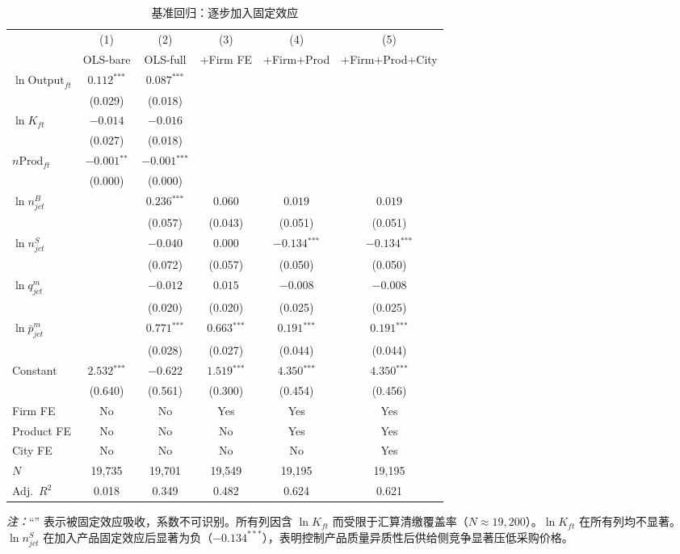 \documentclass[12pt]{article}
\newcommand{\sym}[1]{\ensuremath{^{\text{#1}}}}
\newcommand{\se}[1]{{\small(#1)}}
\newcommand{\abs}{\textemdash}
\newcommand{\mis}{}
\begin{document}
\begin{table}[H]
\centering\small
\begin{threeparttable}
\caption{基准回归：逐步加入固定效应}
\begin{tabular}{l *{5}{c}}
\toprule
 & (1) & (2) & (3) & (4) & (5) \\
 & OLS-bare & OLS-full & {+Firm FE} & {+Firm+Prod} & {+Firm+Prod+City} \\
\midrule
$\ln\mathrm{Output}_{ft}$
  & $0.112\sym{***}$ & $0.087\sym{***}$ & \abs & \abs & \abs \\
  & \se{0.029} & \se{0.018} & & & \\[3pt]
$\ln K_{ft}$
  & $-0.014$ & $-0.016$ & \abs & \abs & \abs \\
  & \se{0.027} & \se{0.018} & & & \\[3pt]
$n\mathrm{Prod}_{ft}$
  & $-0.001\sym{**}$ & $-0.001\sym{***}$ & \abs & \abs & \abs \\
  & \se{0.000} & \se{0.000} & & & \\[3pt]
$\ln n^{B}_{jct}$
  & \mis & $0.236\sym{***}$ & $0.060$ & $0.019$ & $0.019$ \\
  & & \se{0.057} & \se{0.043} & \se{0.051} & \se{0.051} \\[3pt]
$\ln n^{S}_{jct}$
  & \mis & $-0.040$ & $0.000$ & $-0.134\sym{***}$ & $-0.134\sym{***}$ \\
  & & \se{0.072} & \se{0.057} & \se{0.050} & \se{0.050} \\[3pt]
$\ln q^{m}_{jct}$
  & \mis & $-0.012$ & $0.015$ & $-0.008$ & $-0.008$ \\
  & & \se{0.020} & \se{0.020} & \se{0.025} & \se{0.025} \\[3pt]
$\ln\bar{p}^{m}_{jct}$
  & \mis & $0.771\sym{***}$ & $0.663\sym{***}$ & $0.191\sym{***}$ & $0.191\sym{***}$ \\
  & & \se{0.028} & \se{0.027} & \se{0.044} & \se{0.044} \\[3pt]
Constant
  & $2.532\sym{***}$ & $-0.622$ & $1.519\sym{***}$ & $4.350\sym{***}$ & $4.350\sym{***}$ \\
  & \se{0.640} & \se{0.561} & \se{0.300} & \se{0.454} & \se{0.456} \\
\midrule
Firm FE    & No  & No  & Yes & Yes & Yes \\
Product FE & No  & No  & No  & Yes & Yes \\
City FE    & No  & No  & No  & No  & Yes \\
$N$        & 19,735 & 19,701 & 19,549 & 19,195 & 19,195 \\
Adj.\ $R^{2}$ & 0.018 & 0.349 & 0.482 & 0.624 & 0.621 \\
\bottomrule
\end{tabular}
\begin{tablenotes}\small
\item \textit{注：}``\textemdash'' 表示被固定效应吸收，系数不可识别。所有列因含 $\ln K_{ft}$ 而受限于汇算清缴覆盖率（$N\approx19{,}200$）。$\ln K_{ft}$ 在所有列均不显著。$\ln n^{S}_{jct}$ 在加入产品固定效应后显著为负（$-0.134^{***}$），表明控制产品质量异质性后供给侧竞争显著压低采购价格。
\end{tablenotes}
\end{threeparttable}
\end{table}
\end{document}
